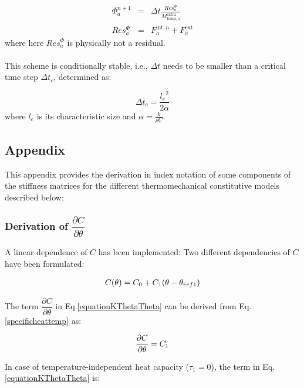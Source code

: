 \documentclass[oneside,11pt,times]{book}
\begin{document}
\begin{eqnarray}
\Phi^{n+1}_a & = & \Delta t \frac{Res^{\Phi}_{a}}{M_{\text{lump},a}^{\text{extra}}}\\\label{eq:PhiNNExp1}
Res^{\Phi}_{a} & = & F^{\text{int},n}_a+ F^{\text{ext}}_a\label{eq:PhiNNExp2}
\end{eqnarray}
where here $Res^{\Phi}_{a}$ is physically not a residual.\\ \\
This scheme is conditionally stable, i.e., $\Delta t$ needs to be smaller than a critical time step $\Delta t_c$, determined as:

\begin{equation}
  \Delta t_c = \frac{{l_e}^2}{2 \alpha}
\end{equation}
where $l_e$ is its characteristic size and $\alpha=\frac{k}{\rho C}$.

\subsection{Appendix}
This appendix provides the derivation in index notation of some components of the stiffness matrices for the different thermomechanical constitutive models described below:

\subsubsection{Derivation of $\dfrac{\partial{C}}{\partial{\theta}}$}

A linear dependence of $C$ has been implemented: Two different dependencies of $C$ have been formulated:

\begin{equation}
\begin{aligned}
\centering
C(\theta)=C_0+C_1 (\theta-\theta_{ref1})
\end{aligned}
\label{specificheattemp}
\end{equation}

The term $\dfrac{\partial{C}}{\partial{\theta}}$ in Eq.\eqref{equationKThetaTheta} can be derived from Eq.\eqref{specificheattemp} as:

\begin{equation}
\begin{aligned}
\centering
\dfrac{\partial{C}}{\partial{\theta}}=C_1
\end{aligned}
\end{equation}

In case of temperature-independent heat capacity ($\tau_1=0$), the term in Eq.\eqref{equationKThetaTheta} is:
\end{document}
